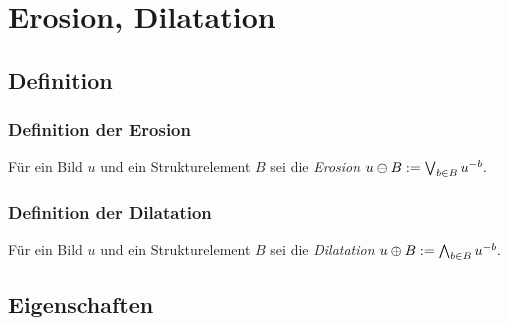 \documentclass{beamer}
\begin{document}
\section{Erosion, Dilatation}

\subsection{Definition}

\begin{frame}
    \frametitle{Definition der Erosion}
    \begin{definition}
        Für ein Bild $u$ und ein Strukturelement $B$ sei die \emph{Erosion}
        \begin{math}
            u \ominus B := \bigvee_{b \in B} u^{-b}.
        \end{math}
    \end{definition}
\end{frame}

\begin{frame}
    \frametitle{Definition der Dilatation}
    \begin{definition}
        Für ein Bild $u$ und ein Strukturelement $B$ sei die \emph{Dilatation}
        \begin{math}
            u \oplus B := \bigwedge_{b \in B} u^{-b}.
        \end{math}
    \end{definition}
\end{frame}

\subsection{Eigenschaften}
\end{document}
